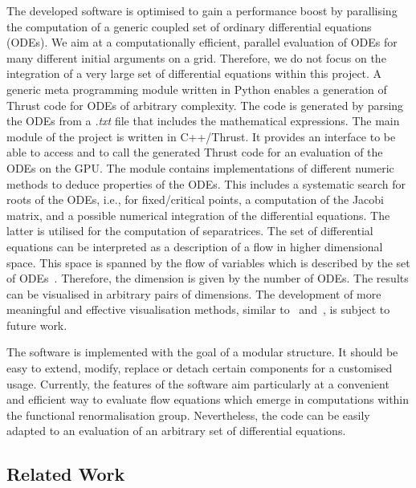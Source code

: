 \documentclass[paper=a4,11pt,bibliography=totoc]{scrartcl}
\begin{document}
The developed software is optimised to gain a performance boost by parallising the computation of a generic coupled set of ordinary differential equations (ODEs). We aim at a computationally efficient, parallel evaluation of ODEs for many different initial arguments on a grid. Therefore, we do not focus on the integration of a very large set of differential equations within this project. A generic meta programming module written in Python enables a generation of Thrust code for ODEs of arbitrary complexity. The code is generated by parsing the ODEs from a \textit{.txt} file that includes the mathematical expressions. The main module of the project is written in C++/Thrust. It provides an interface to be able to access and to call the generated Thrust code for an evaluation of the ODEs on the GPU. The module contains implementations of different numeric methods to deduce properties of the ODEs. This includes a systematic search for roots of the ODEs, i.e., for fixed/critical points, a computation of the Jacobi matrix, and a possible numerical integration of the differential equations. The latter is utilised for the computation of separatrices. The set of differential equations can be interpreted as a description of a flow in higher dimensional space. This space is spanned by the flow of variables which is described by the set of ODEs~\cite{Asimov2003}. Therefore, the dimension is given by the number of ODEs. The results can be visualised in arbitrary pairs of dimensions. The development of more meaningful and effective visualisation methods, similar to~\cite{Noll1967} and~\cite{Hofmann2018}, is subject to future work.

The software is implemented with the goal of a modular structure. It should be easy to extend, modify, replace or detach certain components for a customised usage. Currently, the features of the software aim particularly at a convenient and efficient way to evaluate flow equations which emerge in computations within the functional renormalisation group. Nevertheless, the code can be easily adapted to an evaluation of an arbitrary set of differential equations.

\subsection{Related Work}
\end{document}
